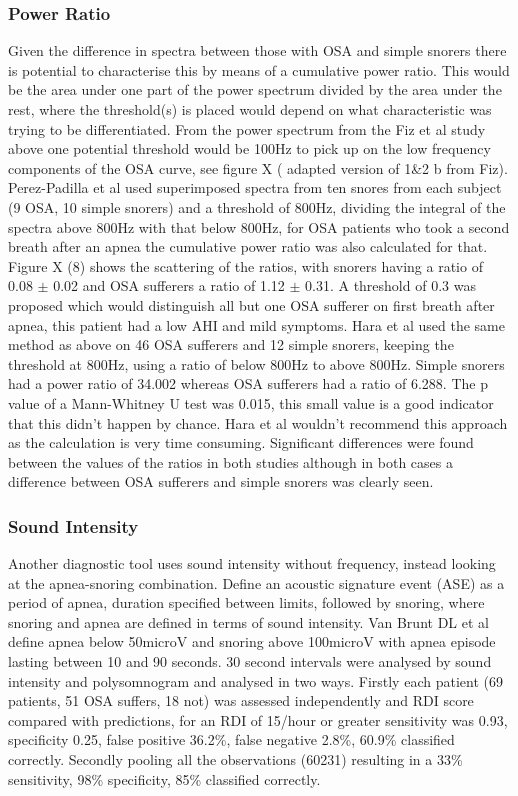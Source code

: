 \subsubsection{Power Ratio}
Given the difference in spectra between those with OSA and simple snorers there is potential to characterise this by means of a cumulative power ratio. This would be the area under one part of the power spectrum divided by the area under the rest, where the threshold(s) is placed would depend on what characteristic was trying to be differentiated. From the power spectrum from the Fiz et al study above one potential threshold would be 100Hz to pick up on the low frequency components of the OSA curve, see figure X ( adapted version of 1\&2 b from Fiz). 
Perez-Padilla et al used superimposed spectra from ten snores from each subject (9 OSA, 10 simple snorers) and a threshold of 800Hz, dividing the integral of the spectra above 800Hz with that below 800Hz, for OSA patients who took a second breath after an apnea the cumulative power ratio was also calculated for that. Figure X (8) shows the scattering of the ratios, with snorers having a ratio of 0.08 $\pm$ 0.02 and OSA sufferers a ratio of 1.12 $\pm$ 0.31. A threshold of 0.3 was proposed which would distinguish all but one OSA sufferer on first breath after apnea, this patient had a low AHI and mild symptoms. 
Hara et al used the same method as above on 46 OSA sufferers and 12 simple snorers, keeping the threshold at 800Hz, using a ratio of below 800Hz to above 800Hz. Simple snorers had a power ratio of 34.002 whereas OSA sufferers had a ratio of 6.288. The p value of a Mann-Whitney U test was 0.015, this small value is a good indicator that this didn’t happen by chance. 
Hara et al wouldn’t recommend this approach as the calculation is very time consuming. Significant differences were found between the values of the ratios in both studies although in both cases a difference between OSA sufferers and simple snorers was clearly seen. 

\subsubsection{Sound Intensity}
Another diagnostic tool uses sound intensity without frequency, instead looking at the apnea-snoring combination. Define an acoustic signature event (ASE) as a period of apnea, duration specified between limits, followed by snoring, where snoring and apnea are defined in terms of sound intensity.
Van Brunt DL et al define apnea below 50microV and snoring above 100microV with apnea episode lasting between 10 and 90 seconds. 30 second intervals were analysed by sound intensity and polysomnogram and analysed in two ways. Firstly each patient (69 patients, 51 OSA suffers, 18 not) was assessed independently and RDI score compared with predictions, for an RDI of 15/hour or greater sensitivity was 0.93, specificity 0.25, false positive 36.2\%, false negative 2.8\%, 60.9\% classified correctly. Secondly pooling all the observations (60231) resulting in a 33\% sensitivity, 98\% specificity, 85\% classified correctly. 

